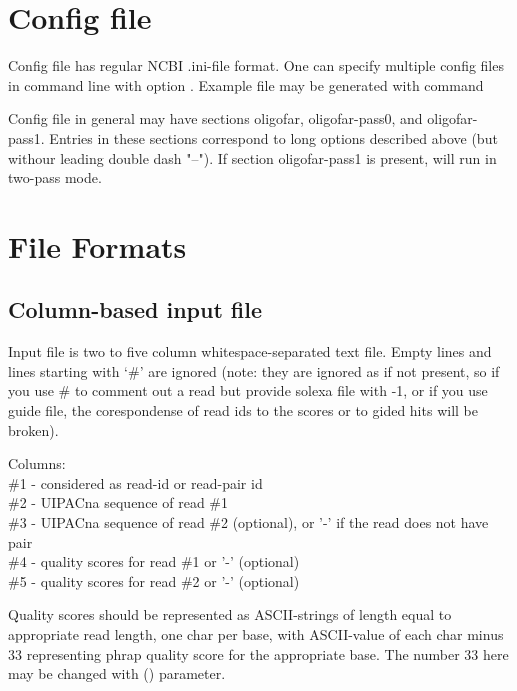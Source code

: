 \documentclass[english]{article}
\begin{document}
\section{Config file}

	Config file has regular NCBI .ini-file format.  One can specify multiple 
	config files in command line with option .  Example file
	may be generated with command ~

	Config file in general may have sections \Lbr oligofar\Rbr, \Lbr oligofar-pass0\Rbr,
	and \Lbr oligofar-pass1\Rbr. Entries in these sections correspond to long options 
	described above (but withour leading double dash "--").  If section \Lbr oligofar-pass1\Rbr
	is present,  will run in two-pass mode.

\section{File Formats}\label{secFileFormats}

\subsection{Column-based input file}

    Input file is two to five column whitespace-separated text file. Empty
    lines and lines starting with `#' are ignored (note: they are ignored as
    if not present, so if you use # to comment out a read but provide solexa
    file with -1, or if you use guide file, the corespondense of read ids to 
    the scores or to gided hits will be broken).

    Columns:\\
	\#1 - considered as read-id or read-pair id\\
    \#2 - UIPACna sequence of read \#1\\
    \#3 - UIPACna sequence of read \#2 (optional), or '-' if the read does not have pair\\
    \#4 - quality scores for read \#1 or '-' (optional)\\
    \#5 - quality scores for read \#2 or '-' (optional)

    Quality scores should be represented as ASCII-strings of length equal to 
    appropriate read length, one char per base, with ASCII-value of each char 
    minus 33 representing phrap quality score for the appropriate base.  The 
    number 33 here may be changed with  () parameter.
\end{document}
